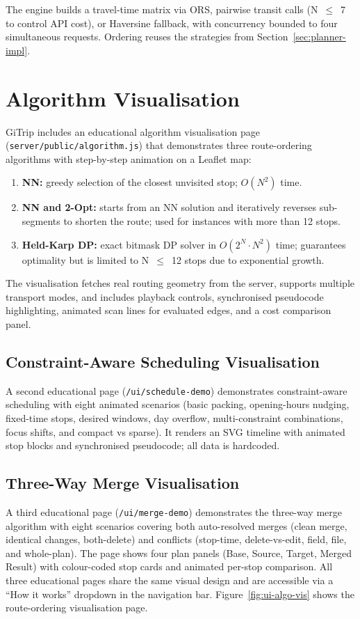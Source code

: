 The engine builds a travel-time matrix via ORS, pairwise transit calls (N~$\leq$~7 to control API cost), or Haversine fallback, with concurrency bounded to four simultaneous requests. Ordering reuses the strategies from Section~\ref{sec:planner-impl}.

\section{Algorithm Visualisation}
GiTrip includes an educational algorithm visualisation page
(\texttt{server/public/algorithm.js}) that demonstrates three route-ordering
algorithms with step-by-step animation on a Leaflet map:
\begin{enumerate}
  \item \textbf{NN:} greedy selection of the closest
        unvisited stop; $O(N^2)$ time.
  \item \textbf{NN and 2-Opt:} starts from an NN solution and iteratively reverses
        sub-segments to shorten the route; used for instances with more than 12
        stops.
  \item \textbf{Held-Karp DP:} exact bitmask DP solver in
        $O(2^N \cdot N^2)$ time; guarantees optimality but is limited to
        N~$\leq$~12 stops due to exponential growth.
\end{enumerate}

The visualisation fetches real routing geometry from the server, supports multiple transport modes, and includes playback controls, synchronised pseudocode highlighting, animated scan lines for evaluated edges, and a cost comparison panel.

\subsection{Constraint-Aware Scheduling Visualisation}
A second educational page (\texttt{/ui/schedule-demo}) demonstrates constraint-aware scheduling with eight animated scenarios (basic packing, opening-hours nudging, fixed-time stops, desired windows, day overflow, multi-constraint combinations, focus shifts, and compact vs sparse). It renders an SVG timeline with animated stop blocks and synchronised pseudocode; all data is hardcoded.

\subsection{Three-Way Merge Visualisation}
A third educational page (\texttt{/ui/merge-demo}) demonstrates the three-way
merge algorithm with eight scenarios covering both auto-resolved merges (clean
merge, identical changes, both-delete) and conflicts (stop-time, delete-vs-edit,
field, file, and whole-plan). The page shows four plan panels (Base, Source,
Target, Merged Result) with colour-coded stop cards and animated per-stop
comparison. All three educational pages share the same visual design and
are accessible via a ``How it works'' dropdown in the navigation bar.
Figure~\ref{fig:ui-algo-vis} shows the route-ordering visualisation page.

